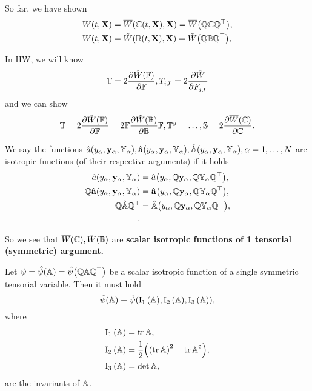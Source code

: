 \documentclass[reqno, a4paper]{article}
\begin{document}
So far, we have shown
\begin{align*}
	W\qty(t,\vb{X}) &= \overline{W}\qty(\mathbb{C}\qty(t,\vb{X}),\vb{X}) = \overline{W}\qty(\mathbb{Q}\mathbb{C} \mathbb{Q}^\top), \\ W\qty(t,\vb{X}) &= \tilde{W}\qty(\mathbb{B}(t,\vb{X}), \vb{X}) = \tilde{W}\qty(\mathbb{Q} \mathbb{B} \mathbb{Q}^\top),
\end{align*}

In HW, we will know
\[
	\pkstress = 2 \pdv{\hat{W}\qty(\fgrad)}{\fgrad}, T \indices{_{iJ}} = 2 \pdv{\hat{W}}{F \indices{_{iJ}}}
\]
and we can show
\[
	\mathbb{T} = 2\pdv{\hat{W}\qty(\ensuremath{\mathbb{F}})}{\ensuremath{\mathbb{F}}} = 2 \mathbb{F} \pdv{\tilde{W}\qty(\ensuremath{\mathbb{B}})}{\ensuremath{\mathbb{B}}}\mathbb{F}, \mathbb{T}^y  = \dots, \mathbb{S} = 2 \pdv{\overline{W}\qty(\ensuremath{\mathbb{C}})}{\ensuremath{\mathbb{C}}}.
\]

\begin{definition}
	We say the functions $\hat{a}\qty(y_{\alpha}, \vb{y}_{\alpha}, \mathbb{Y}_{\alpha}), \vb{\hat{a}}\qty(y_{\alpha}, \vb{y}_{\alpha}, \mathbb{Y}_{\alpha}), \hat{\mathbb{A}}\qty(y_{\alpha},\vb{y}_{\alpha},\mathbb{Y}_{\alpha}), \alpha = 1, \dots, N$ are isotropic functions (of their respective arguments) if it holds
	\begin{align*}
		\hat{a}\qty(y_{\alpha}, \vb{y}_{\alpha}, \mathbb{Y}_{\alpha}) &= \hat{a}\qty(y_{\alpha}, \mathbb{Q}\vb{y}_{\alpha}, \mathbb{Q} \mathbb{Y}_{\alpha} \mathbb{Q}^\top), \\
		\mathbb{Q} \vb{\hat{a}}\qty(y_{\alpha}, \vb{y}_{\alpha}, \mathbb{Y}_{\alpha}) &= \vb{\hat{a}}\qty(y_{\alpha}, \mathbb{Q}\vb{y}_{\alpha}, \mathbb{Q}\mathbb{Y}_{\alpha}\mathbb{Q}^\top), \\
		\mathbb{Q}\hat{\mathbb{A}} \mathbb{Q}^\top &= \hat{\mathbb{A}}\qty(y_{\alpha}, \mathbb{Q}\vb{y}_{\alpha}, \mathbb{Q}\mathbb{Y}_{\alpha}\mathbb{Q}^\top), \\.
	\end{align*}
\end{definition}
So we see that $\overline{W}\qty(\mathbb{C}), \tilde{W}\qty(\mathbb{B})$ are \textbf{scalar isotropic functions of 1 tensorial (symmetric) argument.}

\begin{theorem}
	Let $\psi = \hat{\psi}\qty(\mathbb{A}) = \hat{\psi}\qty(\mathbb{Q}\mathbb{A}\mathbb{Q}^\top)$ be a scalar isotropic function of a single symmetric tensorial variable. Then it must hold
	\[
		\hat{\psi}\qty(\mathbb{A}) \equiv \hat{\psi}\qty(\operatorname{I_1}\qty(\mathbb{A}),\operatorname{I_2}\qty(\mathbb{A}),\operatorname{I_3}\qty(\mathbb{A})),
	\]	
where
\begin{align*}
	\operatorname{I_1}\qty(\mathbb{A}) &= \tr \mathbb{A},\\
	\operatorname{I_2}\qty(\mathbb{A}) &= \frac{1}{2}\qty(\qty(\tr \mathbb{A})^{2}-\tr \mathbb{A}^{2}),\\
	\operatorname{I_3}\qty(\mathbb{A}) &= \det \mathbb{A},
\end{align*}
are the invariants of $\mathbb{A}$.
\end{theorem}
\end{document}

